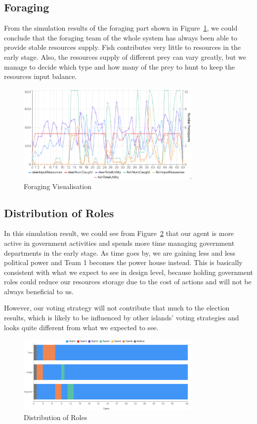 \subsection{Foraging} \label{subsec:Team6_Eval_Foraging}

From the simulation results of the foraging part shown in Figure~\ref{fig:foraging}, we could conclude that the foraging team of the whole system has always been able to provide stable resources supply. Fish contributes very little to resources in the early stage. Also, the resources supply of different prey can vary greatly, but we manage to decide which type and how many of the prey to hunt to keep the resources input balance.
\begin{figure}[H]
    \centering
    \includegraphics[width=0.8\textwidth]{14_team6_agentdesign/images/foraging.png}
    \caption{Foraging Visualisation}
    \label{fig:foraging}
\end{figure}

\subsection{Distribution of Roles} \label{subsec:Team6_Eval_Roles}

In this simulation result, we could see from Figure~\ref{fig:roles} that our agent is more active in government activities and spends more time managing government departments in the early stage. As time goes by, we are gaining less and less political power and Team 1 becomes the power house instead. This is basically consistent with what we expect to see in design level, because holding government roles could reduce our resources storage due to the cost of actions and will not be always beneficial to us. 

However, our voting strategy will not contribute that much to the election results, which is likely to be influenced by other islands' voting strategies and looks quite different from what we expected to see.
\begin{figure}[H]
    \centering
    \includegraphics[width=0.8\textwidth]{14_team6_agentdesign/images/roles.png}
    \caption{Distribution of Roles}
    \label{fig:roles}
\end{figure}



